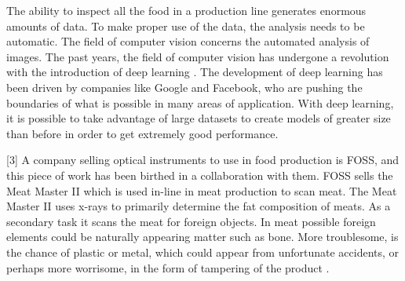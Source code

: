The ability to inspect all the food in a production line generates enormous amounts of data.
To make proper use of the data, the analysis needs to be automatic.
The field of computer vision concerns the automated analysis of images.
The past years, the field of computer vision has undergone a revolution with the introduction of deep learning \cite{lecunDeepLearning2015}.
The development of deep learning has been driven by companies like Google and Facebook, who are pushing the boundaries of what is possible in many areas of application.
With deep learning, it is possible to take advantage of large datasets to create models of greater size than before in order to get extremely good performance.

[3]
A company selling optical instruments to use in food production is FOSS, and this piece of work has been birthed in a collaboration with them. 
FOSS sells the Meat Master II \cite{100MeatAnalysis} which is used in-line in meat production to scan meat. 
The Meat Master II uses x-rays to primarily determine the fat composition of meats. 
As a secondary task it scans the meat for foreign objects.
In meat possible foreign elements could be naturally appearing matter such as bone.
More troublesome, is the chance of plastic or metal, which could appear from unfortunate accidents, or perhaps more worrisome, in the form of tampering of the product \cite{nov28HalifaxPoliceInvestigating2016}.

